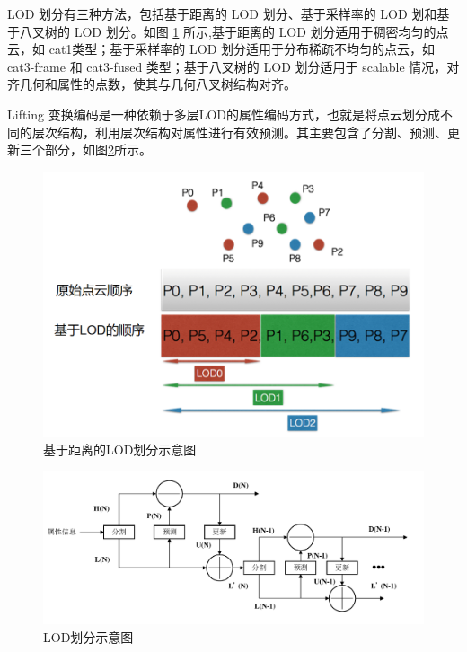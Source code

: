 \documentclass[bachelor,print,msfonts]{xduthesis}
\begin{document}
LOD 划分有三种方法，包括基于距离的 LOD 划分、基于采样率的 LOD 划和基于八叉树的 LOD 划分。如图 \ref{fig:10} 所示,基于距离的 LOD 划分适用于稠密均匀的点云，如 cat1类型；基于采样率的 LOD 划分适用于分布稀疏不均匀的点云，如 cat3-frame 和 cat3-fused 类型；基于八叉树的 LOD 划分适用于 scalable 情况，对齐几何和属性的点数，使其与几何八叉树结构对齐。

Lifting 变换编码是一种依赖于多层LOD的属性编码方式，也就是将点云划分成不同的层次结构，利用层次结构对属性进行有效预测。其主要包含了分割、预测、更新三个部分，如图\ref{fig:提升变换流程图}所示。
\begin{figure}[h]
    \centering
    \includegraphics[scale=0.3]{image/LOD.png}
    \caption{基于距离的LOD划分示意图}
    \label{fig:10}
\end{figure}

\begin{figure}[h]
    \centering
    \includegraphics[scale=0.5]{image/提升变换流程图v2.pdf}
    \caption{LOD划分示意图}
    \label{fig:提升变换流程图}
\end{figure}
\end{document}
